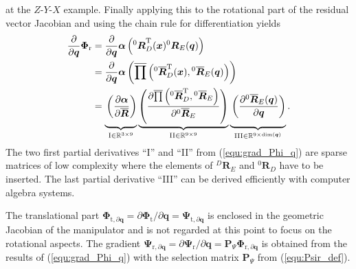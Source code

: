 \documentclass{svproc}
\newcommand{\bm}[1]{\boldsymbol{#1}}
\newcommand{\rotmat}[2]{{{ }^{#1}\boldsymbol{R}}_{#2}}
\newcommand{\rotmato}[2]{{{ }^{#1}\boldsymbol{\overline{R}}}_{#2}}
\newcommand{\transp}[0]{{\mathrm{T}}}
\begin{document}
%
at the $Z$-$Y$-$X$ example.
Finally applying this to the rotational part of the residual vector Jacobian and using the chain rule for differentiation yields
%
\begin{align}
\frac{\partial}{\partial \bm{q}}\bm{\Phi}_{\mathrm{r}}
&=
\frac{\partial}{\partial \bm{q}} \bm{\alpha}\left(\rotmat{0}{D}^\transp(\bm{x}) \rotmat{0}{E}(\bm{q})\right) \label{equ:grad_Phi_q}\\
&=
\frac{\partial}{\partial \bm{q}} \bm{\alpha}\left(\overline{\prod}\left( \rotmato{0}{D}^\transp(\bm{x}), \rotmato{0}{E}(\bm{q})\right)\right) \nonumber \\
&=
\underbrace{\vphantom{\left(\frac{\partial \overline{\prod}\left(\rotmato{0}{D}^\transp, \rotmato{0}{E}\right)}{\partial \rotmato{0}{E}}\right)}\left(\frac{\partial \bm{\alpha}}{\partial \overline{\bm{R}}}\right)}_{\mathrm{I} \in {\mathbb{R}}^{3 \times 9}}
\underbrace{\left(\frac{\partial \overline{\prod}\left(\rotmato{0}{D}^\transp, \rotmato{0}{E}\right)}{\partial \rotmato{0}{E}}\right)}_{\mathrm{II} \in {\mathbb{R}}^{9 \times 9}}
\underbrace{\vphantom{\left(\frac{\partial \overline{\prod}\left(\rotmato{0}{D}^\transp, \rotmato{0}{E}\right)}{\partial \rotmato{0}{E}}\right)}\left(\frac{\partial \rotmato{0}{E}(\bm{q})}{\partial \bm{q}} \right)}_{\mathrm{III} \in {\mathbb{R}}^{9 \times \mathrm{dim}(\bm{q})}}.  \nonumber
\end{align}
%
The two first partial derivatives ``I'' and ``II'' from (\ref{equ:grad_Phi_q}) are sparse matrices of low complexity where the elements of $\rotmat{D}{E}$ and $\rotmat{0}{D}$ have to be inserted.
The last partial derivative ``III'' can be derived efficiently with computer algebra systems.

The translational part $\bm{\Phi}_{\mathrm{t},\partial\bm{q}}=\partial \bm{\Phi}_{\mathrm{t}} / \partial \bm{q}=\bm{\Psi}_{\mathrm{t},\partial\bm{q}}$ is enclosed in the geometric Jacobian of the manipulator and is not regarded at this point to focus on the rotational aspects.
The gradient 
$\bm{\Psi}_{\mathrm{r}, \partial\bm{q}}=\partial \bm{\Psi}_{\mathrm{r}} / \partial \bm{q}=\bm{P}_{\Psi}\bm{\Phi}_{\mathrm{r},\partial\bm{q}}$
is obtained from the results of (\ref{equ:grad_Phi_q}) with the selection matrix $\bm{P}_{\Psi}$ from (\ref{equ:Psir_def}).
\end{document}
